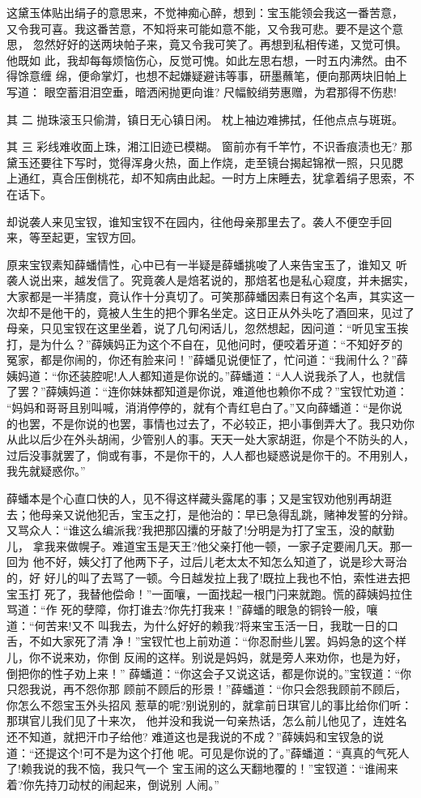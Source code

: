 这黛玉体贴出绢子的意思来，不觉神痴心醉，想到：宝玉能领会我这一番苦意，
又令我可喜。我这番苦意，不知将来可能如意不能，又令我可悲。要不是这个意思，
忽然好好的送两块帕子来，竟又令我可笑了。再想到私相传递，又觉可惧。他既如
此，我却每每烦恼伤心，反觉可愧。如此左思右想，一时五内沸然。由不得馀意缠
绵，便命掌灯，也想不起嫌疑避讳等事，研墨蘸笔，便向那两块旧帕上写道：
眼空蓄泪泪空垂，暗洒闲抛更向谁?
尺幅鲛绡劳惠赠，为君那得不伤悲!

其
二
抛珠滚玉只偷潸，镇日无心镇日闲。
枕上袖边难拂拭，任他点点与斑斑。

其
三
彩线难收面上珠，湘江旧迹已模糊。
窗前亦有千竿竹，不识香痕渍也无?
那黛玉还要往下写时，觉得浑身火热，面上作烧，走至镜台揭起锦袱一照，只见腮
上通红，真合压倒桃花，却不知病由此起。一时方上床睡去，犹拿着绢子思索，不
在话下。

却说袭人来见宝钗，谁知宝钗不在园内，往他母亲那里去了。袭人不便空手回
来，等至起更，宝钗方回。

原来宝钗素知薛蟠情性，心中已有一半疑是薛蟠挑唆了人来告宝玉了，谁知又
听袭人说出来，越发信了。究竟袭人是焙茗说的，那焙茗也是私心窥度，并未据实，
大家都是一半猜度，竟认作十分真切了。可笑那薛蟠因素日有这个名声，其实这一
次却不是他干的，竟被人生生的把个罪名坐定。这日正从外头吃了酒回来，见过了
母亲，只见宝钗在这里坐着，说了几句闲话儿，忽然想起，因问道：“听见宝玉挨
打，是为什么？”薛姨妈正为这个不自在，见他问时，便咬着牙道：“不知好歹的
冤家，都是你闹的，你还有脸来问！”薛蟠见说便怔了，忙问道：“我闹什么？”薛
姨妈道：“你还装腔呢!人人都知道是你说的。”薛蟠道：“人人说我杀了人，也就信
了罢？”薛姨妈道：“连你妹妹都知道是你说，难道他也赖你不成？”宝钗忙劝道：
“妈妈和哥哥且别叫喊，消消停停的，就有个青红皂白了。”又向薛蟠道：“是你说
的也罢，不是你说的也罢，事情也过去了，不必较正，把小事倒弄大了。我只劝你
从此以后少在外头胡闹，少管别人的事。天天一处大家胡逛，你是个不防头的人，
过后没事就罢了，倘或有事，不是你干的，人人都也疑惑说是你干的。不用别人，
我先就疑惑你。”

薛蟠本是个心直口快的人，见不得这样藏头露尾的事；又是宝钗劝他别再胡逛
去；他母亲又说他犯舌，宝玉之打，是他治的：早已急得乱跳，赌神发誓的分辩。
又骂众人：“谁这么编派我?我把那囚攮的牙敲了!分明是为打了宝玉，没的献勤儿，
拿我来做幌子。难道宝玉是天王?他父亲打他一顿，一家子定要闹几天。那一回为
他不好，姨父打了他两下子，过后儿老太太不知怎么知道了，说是珍大哥治的，好
好儿的叫了去骂了一顿。今日越发拉上我了!既拉上我也不怕，索性进去把宝玉打
死了，我替他偿命！”一面嚷，一面找起一根门闩来就跑。慌的薛姨妈拉住骂道：“作
死的孽障，你打谁去?你先打我来！”薛蟠的眼急的铜铃一般，嚷道：“何苦来!又不
叫我去，为什么好好的赖我?将来宝玉活一日，我耽一日的口舌，不如大家死了清
净！”宝钗忙也上前劝道：“你忍耐些儿罢。妈妈急的这个样儿，你不说来劝，你倒
反闹的这样。别说是妈妈，就是旁人来劝你，也是为好，倒把你的性子劝上来！”
薛蟠道：“你这会子又说这话，都是你说的。”宝钗道：“你只怨我说，再不怨你那
顾前不顾后的形景！”薛蟠道：“你只会怨我顾前不顾后，你怎么不怨宝玉外头招风
惹草的呢?别说别的，就拿前日琪官儿的事比给你们听：那琪官儿我们见了十来次，
他并没和我说一句亲热话，怎么前儿他见了，连姓名还不知道，就把汗巾子给他?
难道这也是我说的不成？”薛姨妈和宝钗急的说道：“还提这个!可不是为这个打他
呢。可见是你说的了。”薛蟠道：“真真的气死人了!赖我说的我不恼，我只气一个
宝玉闹的这么天翻地覆的！”宝钗道：“谁闹来着?你先持刀动杖的闹起来，倒说别
人闹。”

